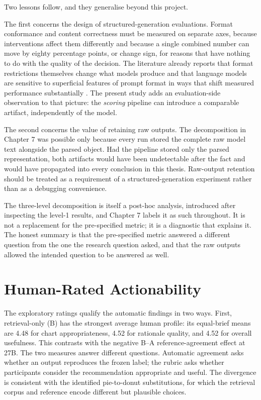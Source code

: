 Two lessons follow, and they generalise beyond this project.

The first concerns the design of structured-generation evaluations. Format conformance and content correctness must be measured on separate axes, because interventions affect them differently and because a single combined number can move by eighty percentage points, or change sign, for reasons that have nothing to do with the quality of the decision. The literature already reports that format restrictions themselves change what models produce \cite{tam2024formatrestrictions} and that language models are sensitive to superficial features of prompt format in ways that shift measured performance substantially \cite{sclar2024formatspread}. The present study adds an evaluation-side observation to that picture: the \emph{scoring} pipeline can introduce a comparable artifact, independently of the model.

The second concerns the value of retaining raw outputs. The decomposition in Chapter 7 was possible only because every run stored the complete raw model text alongside the parsed object. Had the pipeline stored only the parsed representation, both artifacts would have been undetectable after the fact and would have propagated into every conclusion in this thesis. Raw-output retention should be treated as a requirement of a structured-generation experiment rather than as a debugging convenience.

The three-level decomposition is itself a post-hoc analysis, introduced after inspecting the level-1 results, and Chapter 7 labels it as such throughout. It is not a replacement for the pre-specified metric; it is a diagnostic that explains it. The honest summary is that the pre-specified metric answered a different question from the one the research question asked, and that the raw outputs allowed the intended question to be answered as well.

\section{Human-Rated Actionability}

The exploratory ratings qualify the automatic findings in two ways. First, retrieval-only (B) has the strongest average human profile: its equal-brief means are 4.48 for chart appropriateness, 4.52 for rationale quality, and 4.52 for overall usefulness. This contrasts with the negative B--A reference-agreement effect at 27B. The two measures answer different questions. Automatic agreement asks whether an output reproduces the frozen label; the rubric asks whether participants consider the recommendation appropriate and useful. The divergence is consistent with the identified pie-to-donut substitutions, for which the retrieval corpus and reference encode different but plausible choices.

